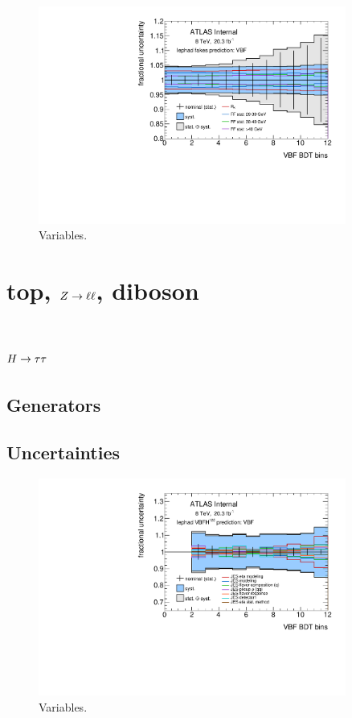 \begin{figure}[tp]
  \includegraphics[width=0.90\textwidth]{figures/uncertainties/uncertainties_lephad_paper14_8TeV_fakes_VBF}
  \caption{Variables.}
  \label{fig:backgrounds-uncertainties-fakes}
\end{figure}

\clearpage

\section{top, $Z \rightarrow \ell\ell$, diboson}
\label{sec:backgrounds-others}

\section{$H\rightarrow\tau\tau$}
\label{sec:backgrounds-htautau}

\subsection{Generators}

\subsection{Uncertainties}

\begin{figure}[tp]
  \includegraphics[width=0.90\textwidth]{figures/uncertainties/uncertainties_lephad_paper14_8TeV_VBFH125_JES_VBF}
  \caption{Variables.}
  \label{fig:backgrounds-uncertainties-vbfjes}
\end{figure}

